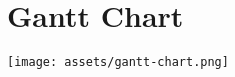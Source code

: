 \begin{figure}[!ht]
    \chapter{Gantt Chart} \label{appendix:gantt-chart}
    \centering
    \texttt{[image: assets/gantt-chart.png]}
\end{figure}
